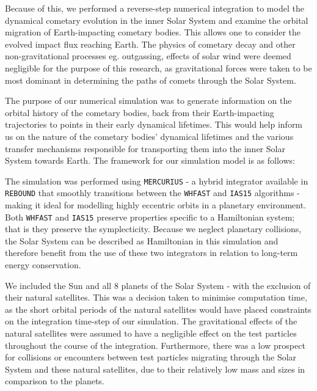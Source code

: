 Because of this, we performed a reverse-step numerical integration to model the dynamical cometary evolution in the inner Solar System and examine the orbital migration of Earth-impacting cometary bodies. This allows one to consider the evolved impact flux reaching Earth. The physics of cometary decay and other non-gravitational processes eg. outgassing, effects of solar wind were deemed negligible for the purpose of this research, as gravitational forces were taken to be most dominant in determining the paths of comets through the Solar System.

The purpose of our numerical simulation was to generate information on the orbital history of the cometary bodies, back from their Earth-impacting trajectories to points in their early dynamical lifetimes. This would help inform us on the nature of the cometary bodies' dynamical lifetimes and the various transfer mechanisms responsible for transporting them into the inner Solar System towards Earth. The framework for our simulation model is as follows:

The simulation was performed using \texttt{MERCURIUS} - a hybrid integrator available in \texttt{REBOUND} that smoothly transitions between the \texttt{WHFAST} \citep{2015MNRAS.452..376R} and \texttt{IAS15} \citep{2015MNRAS.446.1424R} algorithms - making it ideal for modelling highly eccentric orbits in a planetary environment. Both \texttt{WHFAST} and \texttt{IAS15} preserve properties specific to a Hamiltonian system; that is they preserve the symplecticity. Because we neglect planetary collisions, the Solar System can be described as Hamiltonian in this simulation and therefore benefit from the use of these two integrators in relation to long-term energy conservation.

We included the Sun and all 8 planets of the Solar System - with the exclusion of their natural satellites. This was a decision taken to minimise computation time, as the short orbital periods of the natural satellites would have placed constraints on the integration time-step of our simulation. The gravitational effects of the natural satellites were assumed to have a negligible effect on the test particles throughout the course of the integration. Furthermore, there was a low prospect for collisions or encounters between test particles migrating through the Solar System and these natural satellites, due to their relatively low mass and sizes in comparison to the planets.

